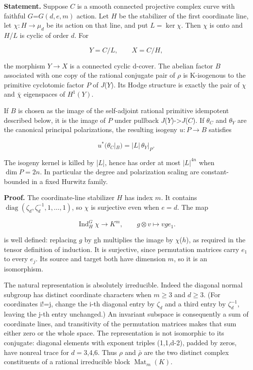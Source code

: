 \textbf{Statement.} Suppose \(C\) is a smooth connected projective complex curve with faithful \(G\)=\(G(d,e,m)\) action. Let \(H\) be the stabilizer of the first coordinate line, let \(\chi:H\to\mu_d\) be its action on that line, and put \(L=\ker\chi\). Then \(\chi\) is onto and \(H\)/\(L\) is cyclic of order \(d\). For

\[
Y=C/L,\qquad X=C/H,
\]

the morphism \(Y\to X\) is a connected cyclic d-cover. The abelian factor \(B\) associated with one copy of the rational conjugate pair of \(\rho\) is K-isogenous to the primitive cyclotomic factor \(P\) of \(J\)(\(Y\)). Its Hodge structure is exactly the pair of \(\chi\) and \(\bar\chi\) eigenspaces of \(H^1(Y)\).

If \(B\) is chosen as the image of the self-adjoint rational primitive idempotent described below, it is the image of \(P\) under pullback \(J\)(\(Y\))-\textgreater{}\(J\)(\(C\)). If \(\theta_C\) and \(\theta_Y\) are the canonical principal polarizations, the resulting isogeny \(u:P\to B\) satisfies

\[
u^*(\theta_C|_B)=|L|\,\theta_Y|_P.
\]

The isogeny kernel is killed by |\(L\)|, hence has order at most \(|L|^{4n}\) when \(\dim P=2n\). In particular the degree and polarization scaling are constant-bounded in a fixed Hurwitz family.

\textbf{Proof.} The coordinate-line stabilizer \(H\) has index \(m\). It contains \(\operatorname{diag}(\zeta_d,\zeta_d^{-1},1,\ldots,1)\), so \(\chi\) is surjective even when \(e= d\). The map

\[
\operatorname{Ind}_H^G\chi\longrightarrow K^m,\qquad g\otimes v\longmapsto vge_1.
\]

is well defined: replacing \(g\) by gh multiplies the image by \(\chi\)(\(h\)), as required in the tensor definition of induction. It is surjective, since permutation matrices carry \(e_1\) to every \(e_j\). Its source and target both have dimension \(m\), so it is an isomorphism.

The natural representation is absolutely irreducible. Indeed the diagonal normal subgroup has distinct coordinate characters when \(m\geq 3\) and \(d\geq 3\). (For coordinates i!=j, change the i-th diagonal entry by \(\zeta_d\) and a third entry by \(\zeta_d^{-1}\), leaving the j-th entry unchanged.) An invariant subspace is consequently a sum of coordinate lines, and transitivity of the permutation matrices makes that sum either zero or the whole space. The representation is not isomorphic to its conjugate: diagonal elements with exponent triples (1,1,d-2), padded by zeros, have nonreal trace for \(d= 3\),4,6. Thus \(\rho\) and \(\bar\rho\) are the two distinct complex constituents of a rational irreducible block \(\operatorname{Mat}_m(K)\).

